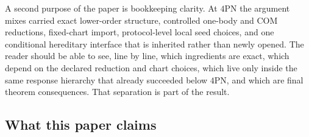 \documentclass[11pt]{article}
\begin{document}
A second purpose of the paper is bookkeeping clarity.  At $4$PN the argument
mixes carried exact lower-order structure, controlled one-body and COM
reductions, fixed-chart import, protocol-level local seed choices, and one
conditional hereditary interface that is inherited rather than newly opened.
The reader should be able to see, line by line, which ingredients are exact,
which depend on the declared reduction and chart choices, which live only inside
the same response hierarchy that already succeeded below $4$PN, and which are
final theorem consequences.  That separation is part of the result.

\subsection{What this paper claims}
\label{sec:intro-claims}
\end{document}
